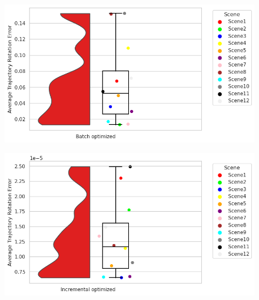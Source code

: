 \documentclass[report.tex]{subfiles}
\begin{document}
\begin{itemize}
\begin{figure}[H]
\centering
\begin{minipage}{.45\textwidth}
  \centering
  \includegraphics[scale=0.45]{Images/Average_Trajectory_Rotation_Error_batch.png}
  \label{fig:Average_Trajectory_Rotation_Error_batch.png}
\end{minipage}%
\begin{minipage}{.45\textwidth}
  \centering
  \includegraphics[scale=0.45]{Images/Average_Trajectory_Rotation_Error_incre.png}
  \label{fig:Average_Trajectory_Rotation_Error_incre.png}
\end{minipage}
\end{figure}




\end{itemize}
\end{document}
